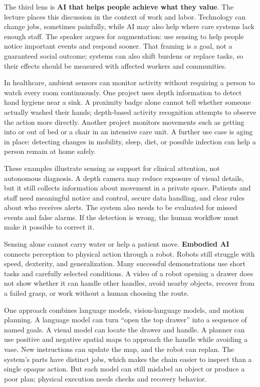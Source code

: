 \hypertarget{04-visual-computing-ii-ch034-ai-that-helps-people-see-and-act}{}

The third lens is \textbf{AI that helps people achieve what they value}. The lecture places this discussion in the context of work and labor. Technology can change jobs, sometimes painfully, while AI may also help where care systems lack enough staff. The speaker argues for augmentation: use sensing to help people notice important events and respond sooner. That framing is a goal, not a guaranteed social outcome; systems can also shift burdens or replace tasks, so their effects should be measured with affected workers and communities.

In healthcare, ambient sensors can monitor activity without requiring a person to watch every room continuously. One project uses depth information to detect hand hygiene near a sink. A proximity badge alone cannot tell whether someone actually washed their hands; depth-based activity recognition attempts to observe the action more directly. Another project monitors movements such as getting into or out of bed or a chair in an intensive care unit. A further use case is aging in place: detecting changes in mobility, sleep, diet, or possible infection can help a person remain at home safely.

These examples illustrate sensing as support for clinical attention, not autonomous diagnosis. A depth camera may reduce exposure of visual details, but it still collects information about movement in a private space. Patients and staff need meaningful notice and control, secure data handling, and clear rules about who receives alerts. The system also needs to be evaluated for missed events and false alarms. If the detection is wrong, the human workflow must make it possible to correct it.

Sensing alone cannot carry water or help a patient move. \textbf{Embodied AI} connects perception to physical action through a robot. Robots still struggle with speed, dexterity, and generalization. Many successful demonstrations use short tasks and carefully selected conditions. A video of a robot opening a drawer does not show whether it can handle other handles, avoid nearby objects, recover from a failed grasp, or work without a human choosing the route.

One approach combines language models, vision-language models, and motion planning. A language model can turn ``open the top drawer'' into a sequence of named goals. A visual model can locate the drawer and handle. A planner can use positive and negative spatial maps to approach the handle while avoiding a vase. New instructions can update the map, and the robot can replan. The system's parts have distinct jobs, which makes the chain easier to inspect than a single opaque action. But each model can still mislabel an object or produce a poor plan; physical execution needs checks and recovery behavior.

